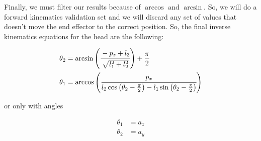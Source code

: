 Finally, we must filter our results because of $\arccos\text{ and }\arcsin$. So, we will do a forward kinematics validation set and we will discard any set of values that doesn't move the end effector to the correct position.
So, the final inverse kinematics equations for the head are the following:
\begin{small}
\begin{align*}
\theta_2 &= \arcsin\left(\cfrac{- p_z + l_3}{ \sqrt{l^2_1 + l^2_2} }\right) + \frac{\pi}{2}\\
\theta_1 &= \arccos\left(\cfrac{p_x}{l_2\cos\left(\theta_2 - \frac{\pi}{2}\right) - l_1\sin\left(\theta_2 - \frac{\pi}{2}\right) } \right)
\end{align*}
\end{small}
or only with angles
\begin{small}
\begin{align*}
\theta_1 &= a_z\\
\theta_2 &= a_y
\end{align*}
\end{small}

